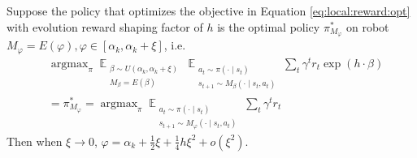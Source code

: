 \begin{theorem}\label{thm:revolver}

Suppose the policy that optimizes the objective in Equation \eqref{eq:local:reward:opt} with evolution reward shaping factor of $h$ is the optimal policy $\pi_{M_\varphi}^*$ on robot $M_\varphi=E(\varphi), \varphi \in [\alpha_k, \alpha_k + \xi]$, i.e. 
\begin{equation}\label{eq:thm}
\begin{split}
    & 
    \mathop{\arg\max}_{\pi}
    \mathop{\mathbb{E}}_{ 
    \substack{
    \beta \sim U(\alpha_k, \alpha_k + \xi) \\
    M_\beta = E(\beta)
    }}
    \mathop{\mathbb{E}}_{ 
    \substack{a_t \sim \pi(\cdot \mid s_t) \\ 
    s_{t+1} \sim M_\beta(\cdot \mid s_t, a_t)}}
    \sum_{t} \gamma^t r_t \exp(h \cdot \beta)
    \\
    & = \pi_{M_\varphi}^* = \mathop{\arg\max}_{\pi}
    \mathop{\mathbb{E}}_{ 
    \substack{a_t \sim \pi(\cdot \mid s_t) \\ 
    s_{t+1} \sim M_\varphi(\cdot \mid s_t, a_t)}}
    \sum_{t} \gamma^t r_t
\end{split}
\end{equation}
Then when $\xi\rightarrow 0$, $\varphi = \alpha_k + \frac{1}{2}\xi + \frac{1}{4} h\xi^2 + o(\xi^2)$.  
\end{theorem}